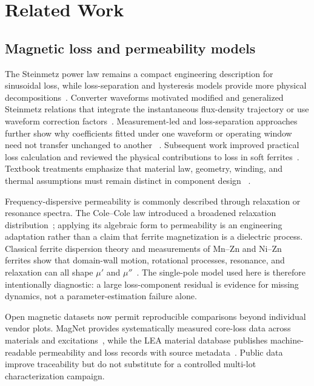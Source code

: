 \hypertarget{related-work}{%
\section{Related Work}\label{related-work}}

\hypertarget{magnetic-loss-and-permeability-models}{%
\subsection{Magnetic loss and permeability
models}\label{magnetic-loss-and-permeability-models}}

The Steinmetz power law remains a compact engineering description for
sinusoidal loss, while loss-separation and hysteresis models provide
more physical
decompositions~\citep{steinmetz1892, bertotti1988, jiles1986}. Converter
waveforms motivated modified and generalized Steinmetz relations that
integrate the instantaneous flux-density trajectory or use waveform
correction factors~\citep{reinert2001, li2001, venkatachalam2002}.
Measurement-led and loss-separation approaches further show why
coefficients fitted under one waveform or operating window need not
transfer unchanged to another ~\citep{vandenbossche2004, roshen2007}.
Subsequent work improved practical loss calculation and reviewed the
physical contributions to loss in soft
ferrites~\citep{muehlethaler2012, dobak2022}. Textbook treatments
emphasize that material law, geometry, winding, and thermal assumptions
must remain distinct in component design
~\citep{snelling1988, mclyman2011}.

Frequency-dispersive permeability is commonly described through
relaxation or resonance spectra. The Cole--Cole law introduced a
broadened relaxation distribution~\citep{cole1941}; applying its
algebraic form to permeability is an engineering adaptation rather than
a claim that ferrite magnetization is a dielectric process. Classical
ferrite dispersion theory and measurements of Mn--Zn and Ni--Zn ferrites
show that domain-wall motion, rotational processes, resonance, and
relaxation can all shape \(\mu'\) and
\(\mu''\)~\citep{snoek1948, tsutaoka2003}. The single-pole model used
here is therefore intentionally diagnostic: a large loss-component
residual is evidence for missing dynamics, not a parameter-estimation
failure alone.

Open magnetic datasets now permit reproducible comparisons beyond
individual vendor plots. MagNet provides systematically measured
core-loss data across materials and excitations~\citep{magnet2022},
while the LEA material database publishes machine-readable permeability
and loss records with source metadata~\citep{materialdatabase}. Public
data improve traceability but do not substitute for a controlled
multi-lot characterization campaign.

